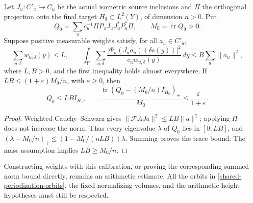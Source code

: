 \begin{corollary}
\label{shared-periodization-calibration}
Let \(J_u:C'_u\hookrightarrow C_u\) be the actual isometric source
inclusions and \(\Pi\) the orthogonal projection onto the final target
\(H_0\subset L^2(Y)\), of dimension \(n>0\). Put
\[
 Q_0=\sum_uc_u^{-1}\Pi P_uJ_uJ_u^*P_u^*\Pi,
 \qquad M_0=\operatorname{tr}Q_0>0.
\]
Suppose positive measurable weights satisfy, for all \(a_u\in C'_u\),
\begin{equation}\label{shared-periodization-weights}
 \sum_{u,\delta}w_{u,\delta}(y)\le L,\qquad
 \int_Y\sum_{u,\delta}
 \frac{|\Phi_u(J_ua_u)(\delta s(y))|^2}{c_uw_{u,\delta}(y)}\,dy
 \le B\sum_u\|a_u\|^2,
\end{equation}
where \(L,B>0\), and the first inequality holds almost everywhere.
If \(LB\le(1+\varepsilon)M_0/n\), with \(\varepsilon\ge0\), then
\[
 Q_0\le LB I_{H_0},\qquad
 \frac{\operatorname{tr}(Q_0-(M_0/n)I_{H_0})_+}{M_0}
 \le\frac{\varepsilon}{1+\varepsilon}.
\]
\end{corollary}
\begin{proof}
Weighted Cauchy--Schwarz gives
\(\|\mathcal F AJ a\|^2\le LB\|a\|^2\); applying \(\Pi\)
does not increase the norm. Thus every eigenvalue \(\lambda\) of
\(Q_0\) lies in \([0,LB]\), and
\((\lambda-M_0/n)_+\le(1-M_0/(nLB))\lambda\).
Summing proves the trace bound. The mass assumption implies
\(LB\ge M_0/n\).
\end{proof}

Constructing weights with this calibration, or proving the corresponding
summed norm bound directly, remains an arithmetic estimate. All the
orbits in \eqref{shared-periodization-orbits}, the fixed normalizing
volumes, and the arithmetic height hypotheses must still be respected.
